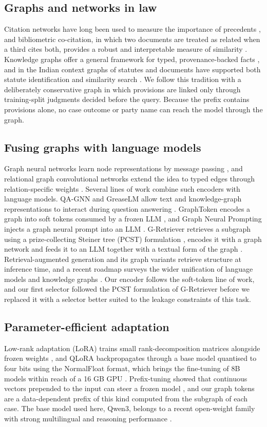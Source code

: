 \documentclass[11pt,a4paper]{article}
\begin{document}
\subsection{Graphs and networks in law}
Citation networks have long been used to measure the importance of precedents \cite{r52}, and bibliometric co-citation, in which two documents are treated as related when a third cites both, provides a robust and interpretable measure of similarity \cite{r31}. Knowledge graphs offer a general framework for typed, provenance-backed facts \cite{r53}, and in the Indian context graphs of statutes and documents have supported both statute identification and similarity search \cite{r16,r17}. We follow this tradition with a deliberately conservative graph in which provisions are linked only through training-split judgments decided before the query. Because the prefix contains provisions alone, no case outcome or party name can reach the model through the graph.

\subsection{Fusing graphs with language models}
Graph neural networks learn node representations by message passing \cite{r54}, and relational graph convolutional networks extend the idea to typed edges through relation-specific weights \cite{r32}. Several lines of work combine such encoders with language models. QA-GNN and GreaseLM allow text and knowledge-graph representations to interact during question answering \cite{r19,r20}. GraphToken encodes a graph into soft tokens consumed by a frozen LLM \cite{r21}, and Graph Neural Prompting injects a graph neural prompt into an LLM \cite{r22}. G-Retriever retrieves a subgraph using a prize-collecting Steiner tree (PCST) formulation \cite{r55}, encodes it with a graph network and feeds it to an LLM together with a textual form of the graph \cite{r23}. Retrieval-augmented generation \cite{r56} and its graph variants \cite{r57} retrieve structure at inference time, and a recent roadmap surveys the wider unification of language models and knowledge graphs \cite{r58}. Our encoder follows the soft-token line of work, and our first selector followed the PCST formulation of G-Retriever before we replaced it with a selector better suited to the leakage constraints of this task.

\subsection{Parameter-efficient adaptation}
Low-rank adaptation (LoRA) trains small rank-decomposition matrices alongside frozen weights \cite{r13}, and QLoRA backpropagates through a base model quantised to four bits using the NormalFloat format, which brings the fine-tuning of 8B models within reach of a 16 GB GPU \cite{r14}. Prefix-tuning showed that continuous vectors prepended to the input can steer a frozen model \cite{r33}, and our graph tokens are a data-dependent prefix of this kind computed from the subgraph of each case. The base model used here, Qwen3, belongs to a recent open-weight family with strong multilingual and reasoning performance \cite{r59}.
\end{document}
